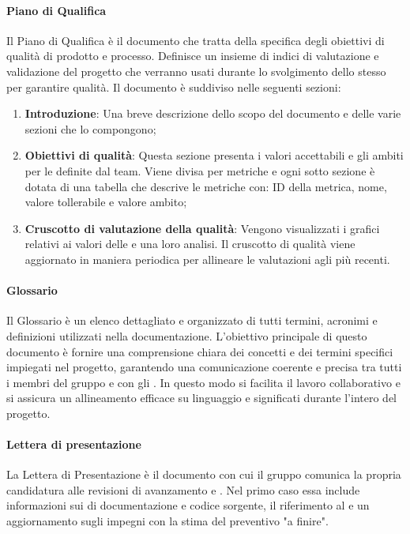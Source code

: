 \paragraph{Piano di Qualifica}
Il Piano di Qualifica è il documento che tratta della specifica degli obiettivi di qualità di prodotto e processo. 
Definisce un insieme di indici di valutazione e validazione del progetto che verranno usati durante lo svolgimento dello stesso per garantire qualità. 
Il documento è suddiviso nelle seguenti sezioni: 
\begin{enumerate}
    \item \textbf{Introduzione}: Una breve descrizione dello scopo del documento e delle varie sezioni che lo compongono;
    \item \textbf{Obiettivi di qualità}: Questa sezione presenta i valori accettabili e gli ambiti per le  definite dal team. Viene divisa per metriche e ogni sotto sezione è dotata di una tabella che descrive le metriche con: ID della metrica, nome, valore tollerabile e valore ambito;
    \item \textbf{Cruscotto di valutazione della qualità}: Vengono visualizzati i grafici relativi ai valori delle  e una loro analisi. Il cruscotto di qualità viene
    aggiornato in maniera periodica per allineare le valutazioni agli  più recenti.
\end{enumerate}

\paragraph{Glossario}
Il Glossario è un elenco dettagliato e organizzato di tutti termini, acronimi e definizioni utilizzati nella documentazione. 
L'obiettivo principale di questo documento è fornire una comprensione chiara dei concetti e dei termini specifici impiegati nel progetto, garantendo una comunicazione coerente e precisa tra tutti i membri del gruppo e con gli . 
In questo modo si facilita il lavoro collaborativo e si assicura un allineamento efficace su linguaggio e significati durante l'intero  del progetto.

\paragraph{Lettera di presentazione}
La Lettera di Presentazione è il documento con cui il gruppo comunica la propria candidatura alle revisioni di avanzamento  e . Nel primo caso essa include informazioni sui  di documentazione e codice sorgente, il riferimento al  e un aggiornamento sugli impegni con la stima del preventivo "a finire". 


